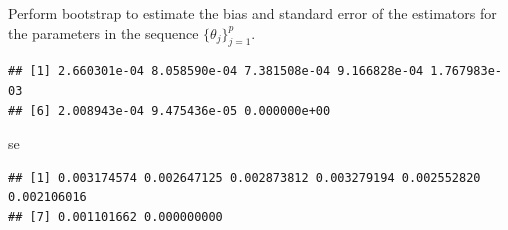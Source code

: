 \documentclass[
]{article}
\newenvironment{Shaded}{\begin{snugshade}}{\end{snugshade}}
\newcommand{\AttributeTok}[1]{\textcolor[rgb]{0.77,0.63,0.00}{#1}}
\newcommand{\ConstantTok}[1]{\textcolor[rgb]{0.00,0.00,0.00}{#1}}
\newcommand{\ControlFlowTok}[1]{\textcolor[rgb]{0.13,0.29,0.53}{\textbf{#1}}}
\newcommand{\DecValTok}[1]{\textcolor[rgb]{0.00,0.00,0.81}{#1}}
\newcommand{\FloatTok}[1]{\textcolor[rgb]{0.00,0.00,0.81}{#1}}
\newcommand{\FunctionTok}[1]{\textcolor[rgb]{0.00,0.00,0.00}{#1}}
\newcommand{\NormalTok}[1]{#1}
\newcommand{\OtherTok}[1]{\textcolor[rgb]{0.56,0.35,0.01}{#1}}
\newcommand{\SpecialCharTok}[1]{\textcolor[rgb]{0.00,0.00,0.00}{#1}}
\begin{document}
Perform bootstrap to estimate the bias and standard error of the
estimators for the parameters in the sequence \(\{\theta_j\}_{j=1}^p\).

\begin{Shaded}
\end{Shaded}

\begin{verbatim}
## [1] 2.660301e-04 8.058590e-04 7.381508e-04 9.166828e-04 1.767983e-03
## [6] 2.008943e-04 9.475436e-05 0.000000e+00
\end{verbatim}

\begin{Shaded}
\begin{Highlighting}[]
\NormalTok{se}
\end{Highlighting}
\end{Shaded}

\begin{verbatim}
## [1] 0.003174574 0.002647125 0.002873812 0.003279194 0.002552820 0.002106016
## [7] 0.001101662 0.000000000
\end{verbatim}
\end{document}
